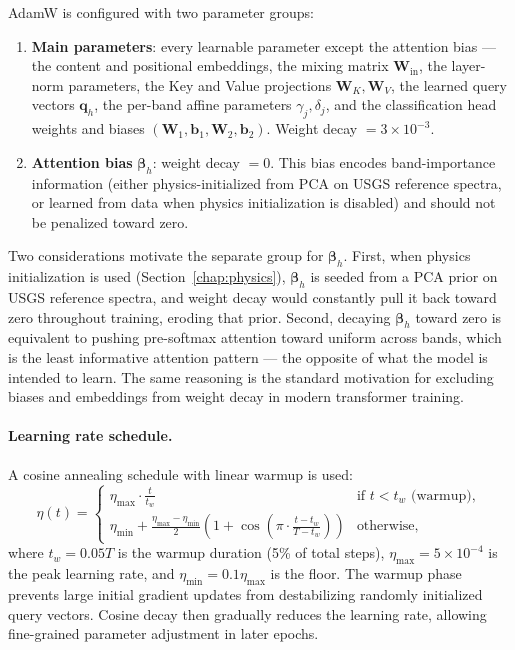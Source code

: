 \documentclass[11pt]{report}
\begin{document}
AdamW is configured with two parameter groups:
\begin{enumerate}[nosep]
  \item \textbf{Main parameters}: every learnable parameter except the attention bias --- the content and positional embeddings, the mixing matrix $\mathbf{W}_{\text{in}}$, the layer-norm parameters, the Key and Value projections $\mathbf{W}_K, \mathbf{W}_V$, the learned query vectors $\mathbf{q}_h$, the per-band affine parameters $\gamma_j, \delta_j$, and the classification head weights and biases $(\mathbf{W}_1, \mathbf{b}_1, \mathbf{W}_2, \mathbf{b}_2)$. Weight decay $= 3 \times 10^{-3}$.
  \item \textbf{Attention bias} $\bm{\beta}_h$: weight decay $= 0$. This bias encodes band-importance information (either physics-initialized from PCA on USGS reference spectra, or learned from data when physics initialization is disabled) and should not be penalized toward zero.
\end{enumerate}
Two considerations motivate the separate group for $\bm{\beta}_h$. First, when physics initialization is used (Section~\ref{chap:physics}), $\bm{\beta}_h$ is seeded from a PCA prior on USGS reference spectra, and weight decay would constantly pull it back toward zero throughout training, eroding that prior. Second, decaying $\bm{\beta}_h$ toward zero is equivalent to pushing pre-softmax attention toward uniform across bands, which is the least informative attention pattern --- the opposite of what the model is intended to learn. The same reasoning is the standard motivation for excluding biases and embeddings from weight decay in modern transformer training.

\paragraph{Learning rate schedule.}
A cosine annealing schedule with linear warmup is used:
\begin{equation}
\eta(t) = \begin{cases}
  \eta_{\max} \cdot \frac{t}{t_w} & \text{if } t < t_w \text{ (warmup)}, \\[4pt]
  \eta_{\min} + \frac{\eta_{\max} - \eta_{\min}}{2}\left(1 + \cos\left(\pi \cdot \frac{t - t_w}{T - t_w}\right)\right) & \text{otherwise},
\end{cases}
\label{eq:cosine_lr}
\end{equation}
where $t_w = 0.05T$ is the warmup duration (5\% of total steps), $\eta_{\max} = 5 \times 10^{-4}$ is the peak learning rate, and $\eta_{\min} = 0.1 \eta_{\max}$ is the floor. The warmup phase prevents large initial gradient updates from destabilizing randomly initialized query vectors. Cosine decay then gradually reduces the learning rate, allowing fine-grained parameter adjustment in later epochs.
\end{document}

